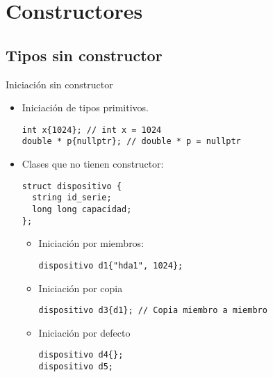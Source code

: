\section{Constructores}

\subsection{Tipos sin constructor}

\begin{frame}[fragile]{Iniciación sin constructor}
\begin{itemize}
  \item Iniciación de tipos primitivos.
\begin{lstlisting}
int x{1024}; // int x = 1024
double * p{nullptr}; // double * p = nullptr
\end{lstlisting}
  \item Clases que no tienen constructor:
\begin{lstlisting}
struct dispositivo {
  string id_serie;
  long long capacidad;
};
\end{lstlisting}
    \begin{itemize}
      \item Iniciación por miembros:
\begin{lstlisting}
dispositivo d1{"hda1", 1024};
\end{lstlisting}
      \item Iniciación por copia
\begin{lstlisting}
dispositivo d3{d1}; // Copia miembro a miembro
\end{lstlisting}
      \item Iniciación por defecto
\begin{lstlisting}
dispositivo d4{};
dispositivo d5;
\end{lstlisting}
    \end{itemize}
\end{itemize}
\end{frame}

